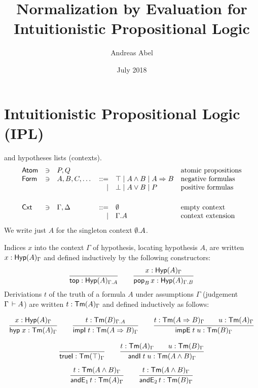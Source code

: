 \documentclass[a4paper]{article}
\title{Normalization by Evaluation for \\ Intuitionistic Propositional Logic}
\author{Andreas Abel}
\date{July 2018}
\begin{document}
\maketitle


\section{Intuitionistic Propositional Logic (IPL)}

 and hypotheses lists (contexts).
\[
\begin{array}{lllrll}
  \Atom & \ni & P,Q & & & \mbox{atomic propositions} \\
  \Form & \ni & A,B,C,\dots
     & ::= & \top \mid A \land B \mid A \imp B
       & \mbox{negative formulas} \\
     &&& \mid & \bot \mid A \lor B \mid P
       & \mbox{positive formulas} \\
\\[1ex]
  \Cxt & \ni & \Gamma,\Delta & ::= & \cempty & \mbox{empty context}
\\ &&& \mid & \Gamma.A & \mbox{context extension}
\end{array}
\]
We write just $A$ for the singleton context $\cempty.A$.

Indices $x$ into the context $\Gamma$ of hypothesis, locating hypothesis
$A$, are written $x : \Hyp[\Gamma]A$ and defined inductively by the
following constructors:
\[
  \ru{}{\ttop : \Hyp[\Gamma.A]A}
\qquad
  \ru{x : \Hyp[\Gamma]A
    }{\pop[B] x : \Hyp[\Gamma.B]A}
\]
Deriviations $t$ of the truth of a formula $A$ under assumptions
$\Gamma$ (judgement $\Gamma \der A$)
are written $t : \Tm[\Gamma]A$ and defined inductively as follows:

\begin{gather*}
  \ru{x : \Hyp[\Gamma]A}{\hyp x : \TmG A}
\qquad
  \ru{t : \Tm[\Gamma.A]B}{\impI t : \TmG{A \imp B}}
\qquad
  \ru{t : \TmG{A \imp B} \qquad
      u : \TmG A
    }{\impE t u : \TmG B}
\end{gather*}

\begin{gather*}
  \ru{}{\trueI : \TmG\top}
\qquad
  \ru{t : \TmG A \qquad
      u : \TmG B
    }{\andI t u : \TmG{A \land B}
    }
\\[1ex]
  \ru{t : \TmG{A \land B}
    }{\andE1 t : \TmG A
    }
\qquad
  \ru{t : \TmG{A \land B}
    }{\andE2 t : \TmG B
    }
\end{gather*}
\end{document}
